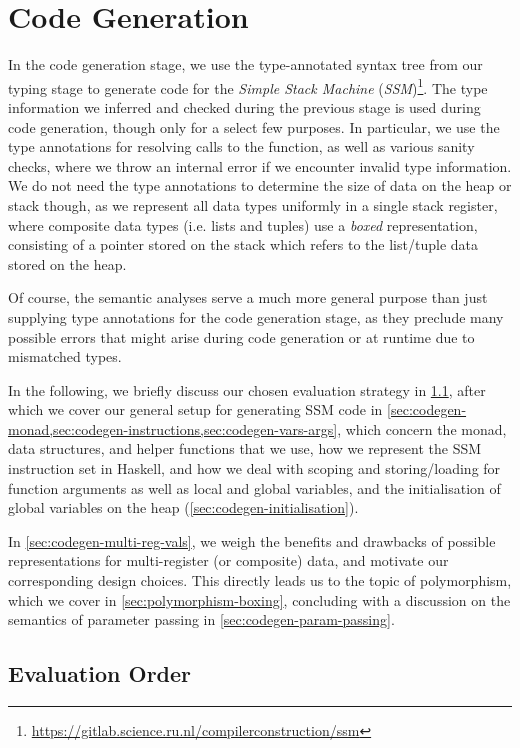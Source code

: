 \chapter{Code Generation} \label{chp:codegen}

In the code generation stage, we use the type-annotated syntax tree from our
typing stage to generate code for the \emph{Simple Stack Machine}
(\emph{SSM})\footnote{\url{https://gitlab.science.ru.nl/compilerconstruction/ssm}}.
The type information we inferred and checked during the previous stage is used
during code generation, though only for a select few purposes.
In particular, we use the type annotations for resolving calls to the
 function, as well as various sanity checks, where we throw an
internal error if we encounter invalid type information.
We do not need the type annotations to determine the size of data on the heap or
stack though, as we represent all data types uniformly in a single stack
register, where composite data types (i.e. lists and tuples) use a \emph{boxed}
representation, consisting of a pointer stored on the stack which refers to
the list/tuple data stored on the heap.

Of course, the semantic analyses serve a much more general purpose than just
supplying type annotations for the code generation stage, as they preclude many
possible errors that might arise during code generation or at runtime due to
mismatched types.

In the following, we briefly discuss our chosen evaluation strategy in
\cref{sec:codegen-eval-order}, after which we cover our general setup for
generating SSM code in
\cref{sec:codegen-monad,sec:codegen-instructions,sec:codegen-vars-args},
which concern the monad, data structures, and helper functions that we use, how
we represent the SSM instruction set in Haskell, and how we deal with scoping
and storing/loading for function arguments as well as local and global variables,
and the initialisation of global variables on the heap
(\cref{sec:codegen-initialisation}).

In \cref{sec:codegen-multi-reg-vals}, we weigh the benefits and drawbacks of possible
representations for multi-register (or composite) data, and motivate our corresponding
design choices. This directly leads us to the topic of polymorphism, which we
cover in \cref{sec:polymorphism-boxing}, concluding with a discussion on the
semantics of parameter passing in \cref{sec:codegen-param-passing}.



\section{Evaluation Order} \label{sec:codegen-eval-order}

